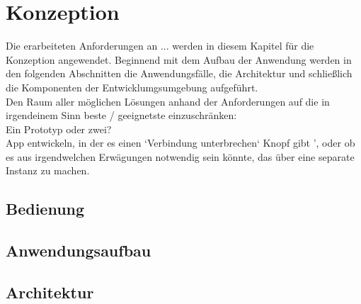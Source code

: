 \chapter{\label{chap:konzeption}Konzeption}
Die erarbeiteten Anforderungen an ... werden in diesem Kapitel für die Konzeption angewendet.
Beginnend mit dem Aufbau der Anwendung werden in den folgenden Abschnitten die Anwendungsfälle,
die Architektur und schließlich die Komponenten der Entwicklumgsumgebung aufgeführt.\\
Den Raum aller möglichen Lösungen anhand der Anforderungen auf die in irgendeinem Sinn beste / geeignetste einzuschränken:\\
Ein Prototyp oder zwei?\\
App entwickeln, in der es einen `Verbindung unterbrechen` Knopf gibt ', oder ob es aus irgendwelchen Erwägungen notwendig sein könnte, das über eine separate Instanz zu machen.
%
%
\section{Bedienung}
\section{Anwendungsaufbau}
%
%
\section{Architektur}
%
%
